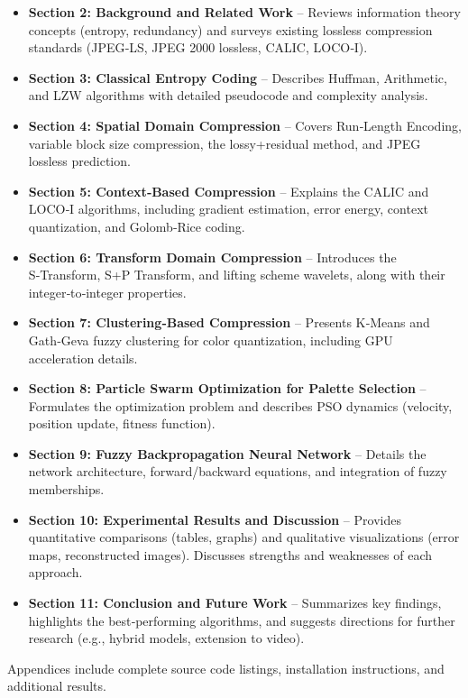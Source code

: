 \begin{itemize}
    \item \textbf{Section 2: Background and Related Work} – Reviews information theory concepts (entropy, redundancy) and surveys existing lossless compression standards (JPEG‑LS, JPEG 2000 lossless, CALIC, LOCO‑I).
    \item \textbf{Section 3: Classical Entropy Coding} – Describes Huffman, Arithmetic, and LZW algorithms with detailed pseudocode and complexity analysis.
    \item \textbf{Section 4: Spatial Domain Compression} – Covers Run‑Length Encoding, variable block size compression, the lossy+residual method, and JPEG lossless prediction.
    \item \textbf{Section 5: Context‑Based Compression} – Explains the CALIC and LOCO‑I algorithms, including gradient estimation, error energy, context quantization, and Golomb‑Rice coding.
    \item \textbf{Section 6: Transform Domain Compression} – Introduces the S‑Transform, S+P Transform, and lifting scheme wavelets, along with their integer‑to‑integer properties.
    \item \textbf{Section 7: Clustering‑Based Compression} – Presents K‑Means and Gath‑Geva fuzzy clustering for color quantization, including GPU acceleration details.
    \item \textbf{Section 8: Particle Swarm Optimization for Palette Selection} – Formulates the optimization problem and describes PSO dynamics (velocity, position update, fitness function).
    \item \textbf{Section 9: Fuzzy Backpropagation Neural Network} – Details the network architecture, forward/backward equations, and integration of fuzzy memberships.
    \item \textbf{Section 10: Experimental Results and Discussion} – Provides quantitative comparisons (tables, graphs) and qualitative visualizations (error maps, reconstructed images). Discusses strengths and weaknesses of each approach.
    \item \textbf{Section 11: Conclusion and Future Work} – Summarizes key findings, highlights the best‑performing algorithms, and suggests directions for further research (e.g., hybrid models, extension to video).
\end{itemize}

Appendices include complete source code listings, installation instructions, and additional results.